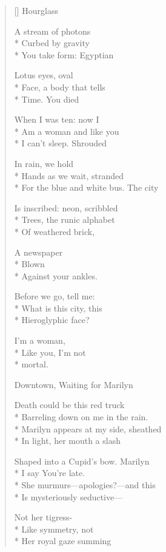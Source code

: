 \label{ch:marilyn_poems}
\settowidth{\versewidth}{And desired.   Each eyelash is curled and raised}
\begin{verse}[\versewidth]
          Hourglass

A stream of photons\\*
Curbed by gravity\\*
You take form:     Egyptian

Lotus eyes, oval\\*
Face, a body that tells\\*
Time.        You died

When I was ten:  now I\\*
Am a woman and like you\\*
I can't sleep.   Shrouded

In rain, we hold\\*
Hands as we wait, stranded\\*
For the blue and white bus.   The city

Is inscribed:  neon, scribbled\\*
Trees, the runic alphabet\\*
Of weathered brick,

A newspaper\\*
Blown\\*
Against your ankles.

Before we go, tell me:\\*
What is this city, this\\*
Hieroglyphic face?  

I'm a woman,\\*
Like you, I'm not\\*
mortal.

         Downtown, Waiting for Marilyn

Death could be this red truck\\*
Barreling down on me in the rain.\\*
Marilyn appears at my side, sheathed\\*
In light, her mouth a slash

Shaped into a Cupid's bow. \qquad Marilyn\\*
I say \qquad       You're late.\\*
She murmurs---apologies?---and this\\*
Is mysteriously seductive---

Not her tigress-\\*
Like symmetry, not\\*
Her royal gaze summing


\end{verse}
